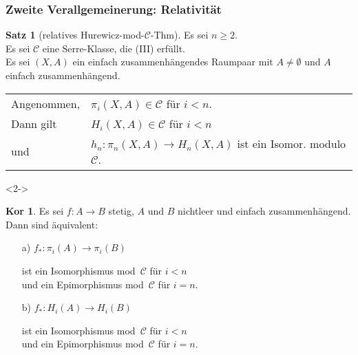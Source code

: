 \documentclass{beamer}
\newcommand{\SC}{\mathcal{C}} %
\theoremstyle{definition}
\newtheorem*{satz}{Satz}
\newtheorem*{kor}{Kor} %
\begin{document}
\begin{frame}
  \frametitle{Zweite Verallgemeinerung: Relativität}

  \begin{satz}[relatives Hurewicz-mod-$\SC$-Thm] Es sei $n \geq 2$. \\
    Es sei $\SC$ eine Serre-Klasse, die (III) erfüllt. \\
    Es sei $(X, A)$ ein einfach zusammenhängendes Raumpaar mit $A \neq \emptyset$ und $A$ einfach zusammenhängend. \\[0.5em]
    
    \begin{tabular}{l l}
      Angenommen, & $\pi_i(X, A) \in \SC$ \enspace für $i < n$. \\
      Dann gilt & $H_i(X, A) \in \SC$ \enspace für $i < n$ \\
      und & $h_n : \pi_n(X, A) \to H_n(X, A)$ ist ein Isomor. modulo $\SC$.
    \end{tabular}
  \end{satz}
  
  \begin{visibleenv}<2->
    \begin{kor}
      Es sei $f : A \to B$ stetig, $A$ und $B$ nichtleer und einfach zusammenhängend.
      Dann sind äquivalent:
      \begin{enumerate}
        \item[a)] $f_* : \pi_i(A) \to \pi_i(B)$ \enspace
        \begin{minipage}[t]{0.65 \linewidth}
          ist ein Isomorphismus mod~$\SC$ für $i < n$ \\
          und ein Epimorphismus mod~$\SC$ für $i = n$.
        \end{minipage}
        \item[b)] $f_* : H_i(A) \to H_i(B)$ \enspace
        \begin{minipage}[t]{0.65 \linewidth}
          ist ein Isomorphismus mod~$\SC$ für $i < n$ \\
          und ein Epimorphismus mod~$\SC$ für $i = n$.
        \end{minipage}
      \end{enumerate}
    \end{kor}
  \end{visibleenv}
\end{frame}
\end{document}
